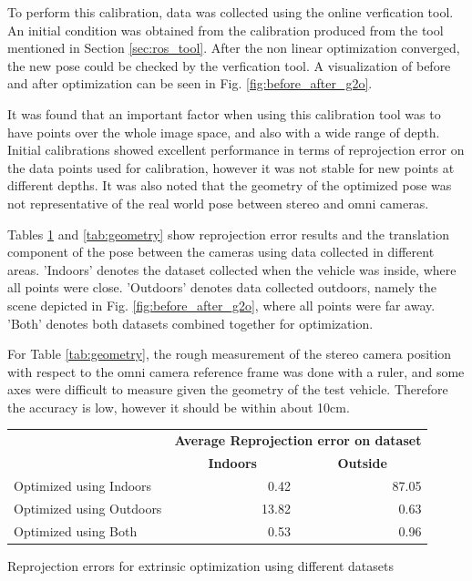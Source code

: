 To perform this calibration, data was collected using the online verfication tool.  An initial condition was obtained from the calibration produced from the tool mentioned in Section \ref{sec:ros_tool}.  After the non linear optimization converged, the new pose could be checked by the verfication tool.  A visualization of before and after optimization can be seen in Fig. \ref{fig:before_after_g2o}. 

It was found that an important factor when using this calibration tool was to have points over the whole image space, and also with a wide range of depth.  Initial calibrations showed excellent performance in terms of reprojection error on the data points used for calibration, however it was not stable for new points at different depths.  It was also noted that the geometry of the optimized pose was not representative of the real world pose between stereo and omni cameras.  

Tables \ref{tab:reprojection_error} and \ref{tab:geometry} show reprojection error results and the translation component of the pose between the cameras using data collected in different areas. 'Indoors' denotes the dataset collected when the vehicle was inside, where all points were close. 'Outdoors' denotes data collected outdoors, namely the scene depicted in Fig. \ref{fig:before_after_g2o}, where all points were far away.  'Both' denotes both datasets combined together for optimization.

For Table \ref{tab:geometry}, the rough measurement of the stereo camera position with respect to the omni camera reference frame was done with a ruler, and some axes were difficult to measure given the geometry of the test vehicle.  Therefore the accuracy is low, however it should be within about 10cm.

\begin{table}[H]
   \begin{tabular}{ p{6cm} r r }
    \toprule
    & \multicolumn{2}{r}{\bf{Average Reprojection error on dataset}}  \\
    & \multicolumn{1}{c}{\hspace*{2cm}\bf{Indoors}} & \multicolumn{1}{c}{\hspace*{2cm}\bf{Outside}} \\
    \midrule
    Optimized using Indoors  & 0.42  & 87.05 \\
    Optimized using Outdoors & 13.82 & 0.63 \\
    Optimized using Both     & 0.53  & 0.96 \\ 
    \bottomrule
    \end{tabular}
     {Reprojection errors for extrinsic optimization using different datasets} 
  \label{tab:reprojection_error}
\end{table}

